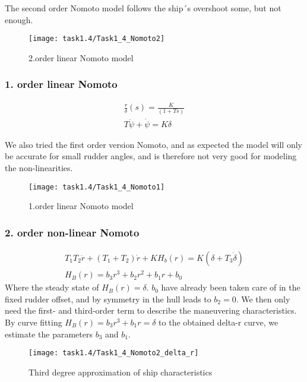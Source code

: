 The second order Nomoto model follows the ship´s overshoot some, but not enough.

\begin{figure}[H]
    \centering
    \texttt{[image: task1.4/Task1\_4\_Nomoto2]}
    \caption{2.order linear Nomoto model}
    \label{fig:nomoto2_lin}
\end{figure}

\newpage
\subsubsection*{1. order linear Nomoto}

\begin{equation}
\begin{split}
	\frac{r}{\delta}(s) = \frac{K}{(1+Ts) } \\
	T\ddot{\psi} + \dot{\psi} = K\delta
\end{split}
\end{equation}

We also tried the first order version Nomoto, and as expected the model will only be accurate for small rudder angles, and is therefore not very good for modeling the non-linearities.

\begin{figure}[H]
    \centering
    \texttt{[image: task1.4/Task1\_4\_Nomoto1]}
    \caption{1.order linear Nomoto model}
    \label{fig:nomoto1_lin}
\end{figure}

\newpage
\subsubsection*{2. order non-linear Nomoto}
\begin{equation}
\begin{split}
	T_1 T_2 \ddot{r} + (T_1 + T_2)\dot{r} + KH_b(r) = K(\delta + T_3\dot{\delta}) \\
	H_B(r) = b_3r^3 + b_2r^2 + b_1r + b_0
\end{split}
\end{equation}
Where the steady state of $H_B(r)=\delta$. $b_0$ have already been taken care of in the fixed rudder offset, and by symmetry in the hull leads to $b_2 = 0$. We then only need the first- and third-order term to describe the maneuvering characteristics. By curve fitting $H_B(r)=b_3r^3 + b_1r=\delta$ to the obtained delta-r curve, we estimate the parameters $b_3$ and $b_1$.
\begin{figure}[H]
    \centering
    \texttt{[image: task1.4/Task1\_4\_Nomoto2\_delta\_r]}
    \caption{Third degree approximation of ship characteristics}
    \label{fig:nomoto2_delta_r}
\end{figure}
    
